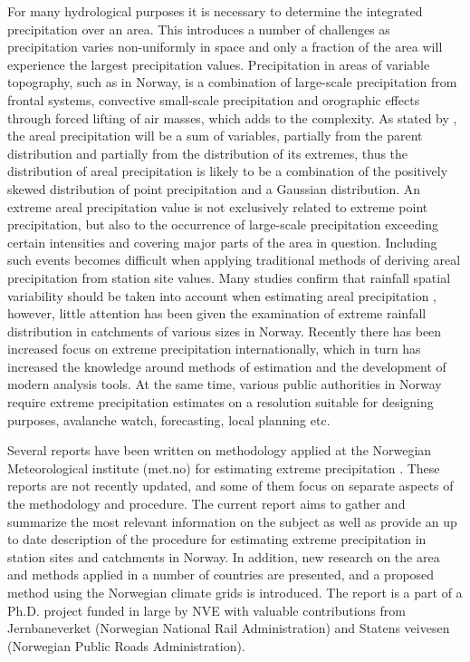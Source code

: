 \documentclass[12pt,a4paper,english]{article}
\begin{document}
For many hydrological purposes it is necessary to determine the integrated precipitation over an area. This introduces a number of challenges as precipitation varies non-uniformly in space and only a fraction of the area will experience the largest precipitation values. Precipitation in areas of variable topography, such as in Norway, is a combination of large-scale precipitation from frontal systems, convective small-scale precipitation and orographic effects through forced lifting of air masses, which adds to the complexity. As stated by \cite{Skaugenetal1996}, the areal precipitation will be a sum of variables, partially from the parent distribution and partially from the distribution of its extremes, thus the distribution of areal precipitation is likely to be a combination of the positively skewed distribution of point precipitation and a Gaussian distribution. An extreme areal precipitation value is not exclusively related to extreme point precipitation, but also to the occurrence of large-scale precipitation exceeding certain intensities and covering major parts of the area in question. Including such events becomes difficult when applying traditional methods of deriving areal precipitation from station site values. Many studies confirm that rainfall spatial variability should be taken into account when estimating areal precipitation \citep{Obledetal1994, Arnaudetal2002, SchuurmansandBierkens2006}, however, little attention has been given the examination of extreme rainfall distribution in catchments of various sizes in Norway. Recently there has been increased focus on extreme precipitation internationally, which in turn has increased the knowledge around methods of estimation and the development of modern analysis tools. At the same time, various public authorities in Norway require extreme precipitation estimates on a resolution suitable for designing purposes, avalanche watch, forecasting, local planning etc.

Several reports have been written on methodology applied at the Norwegian Meteorological institute (met.no) for estimating extreme precipitation \citep{Forland1984a, ForlandandKristoffersen1988, ForlandandKristoffersen1989, Forland1990, Forland1992}. These reports are not recently updated, and some of them focus on separate aspects of the methodology and procedure. The current report aims to gather and summarize the most relevant information on the subject as well as provide an up to date description of the procedure for estimating extreme precipitation in station sites and catchments in Norway. In addition, new research on the area and methods applied in a number of countries are presented, and a proposed method using the Norwegian climate grids is introduced. The report is a part of a Ph.D. project funded in large by NVE with valuable contributions from Jernbaneverket (Norwegian National Rail Administration) and Statens veivesen (Norwegian Public Roads Administration). 
\end{document}
